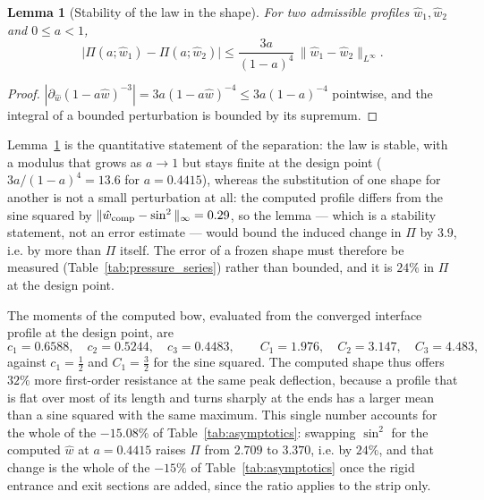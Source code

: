 \documentclass[11pt,a4paper]{article}
\newtheorem{lemma}[theorem]{Lemma}
\begin{document}
\begin{lemma}[Stability of the law in the shape]
\label{lem:lipschitz}
For two admissible profiles $\hat w_1,\hat w_2$ and $0\le a<1$,
\begin{equation}
\bigl|\Pi(a;\hat w_1)-\Pi(a;\hat w_2)\bigr|\le\frac{3a}{(1-a)^4}\,
\|\hat w_1-\hat w_2\|_{L^\infty}.
\label{eq:lipschitz}
\end{equation}
\end{lemma}

\begin{proof}
$|\partial_{\hat w}(1-a\hat w)^{-3}|=3a(1-a\hat w)^{-4}\le3a(1-a)^{-4}$ pointwise, and the
integral of a bounded perturbation is bounded by its supremum.
\end{proof}

Lemma~\ref{lem:lipschitz} is the quantitative statement of the separation: the law is stable,
with a modulus that grows as $a\to1$ but stays finite at the design point ($3a/(1-a)^4=13.6$
for $a=0.4415$), whereas the substitution of one shape for another is not a small perturbation
at all: the computed profile differs from the sine squared by
$\|\hat w_{\rm comp}-\sin^2\|_\infty=0.29$, so the lemma --- which is a stability statement,
not an error estimate --- would bound the induced change in $\Pi$ by $3.9$, i.e. by more than
$\Pi$ itself. The error of a frozen shape must therefore be measured (Table~\ref{tab:pressure_series})
rather than bounded, and it is $24\%$ in $\Pi$ at the design point.

The moments of the computed bow, evaluated from the converged interface profile at the design
point, are
\begin{equation}
c_1=0.6588,\quad c_2=0.5244,\quad c_3=0.4483,\qquad
C_1=1.976,\quad C_2=3.147,\quad C_3=4.483 ,
\label{eq:moments}
\end{equation}
against $c_1=\tfrac12$ and $C_1=\tfrac32$ for the sine squared. The computed shape thus offers
$32\%$ more first-order resistance at the same peak deflection, because a profile that is flat
over most of its length and turns sharply at the ends has a larger mean than a sine squared with
the same maximum. This single number accounts for the whole of the $-15.08\%$ of
Table~\ref{tab:asymptotics}: swapping $\sin^2$ for the computed $\hat w$ at $a=0.4415$ raises
$\Pi$ from $2.709$ to $3.370$, i.e. by $24\%$, and that change is the whole of the $-15\%$ of
Table~\ref{tab:asymptotics} once the rigid entrance and exit sections are added, since the
ratio applies to the strip only.
\end{document}
